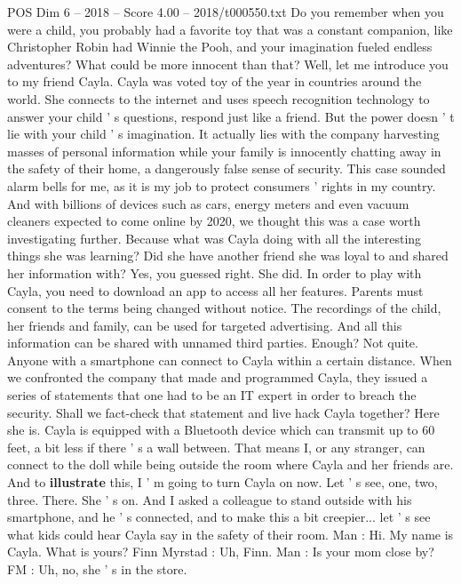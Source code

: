\begin{textsample}{POS Dim 6 – 2018 – Score 4.00 – 2018/t000550.txt}  \label{ex:f6_pos_063}
Do you remember when you were a child, you probably had a favorite toy that was a constant companion, like Christopher Robin had Winnie the Pooh, and your imagination fueled endless adventures?
What could be more innocent than that?
Well, let me introduce you to my friend Cayla.
Cayla was voted toy of the year in countries around the world.
She connects to the internet and uses speech recognition technology to answer your child ' s questions, respond just like a friend.
But the power doesn ' t lie with your child ' s imagination.
It actually lies with the company harvesting masses of personal information while your family is innocently chatting away in the safety of their home, a dangerously false sense of security.
This case sounded alarm bells for me, as it is my job to protect consumers ' rights in my country.
And with billions of devices such as cars, energy meters and even vacuum cleaners expected to come online by 2020, we thought this was a case worth investigating further.
Because what was Cayla doing with all the interesting things she was learning?
Did she have another friend she was loyal to and shared her information with?
Yes, you guessed right.
She did.
In order to play with Cayla, you need to download an app to access all her features.
Parents must consent to the terms being changed without notice.
The recordings of the child, her friends and family, can be used for targeted advertising.
And all this information can be shared with unnamed third parties.
Enough?
Not quite.
Anyone with a smartphone can connect to Cayla within a certain distance.
When we confronted the company that made and programmed Cayla, they issued a series of statements that one had to be an IT expert in order to breach the security.
Shall we fact-check that statement and live hack Cayla together?
Here she is.
Cayla is equipped with a Bluetooth device which can transmit up to 60 feet, a bit less if there ' s a wall between.
That means I, or any stranger, can connect to the doll while being outside the room where Cayla and her friends are.
And to \textbf{illustrate} this, I ' m going to turn Cayla on now.
Let ' s see, one, two, three.
There.
She ' s on.
And I asked a colleague to stand outside with his smartphone, and he ' s connected, and to make this a bit creepier... let ' s see what kids could hear Cayla say in the safety of their room.
Man : Hi.
My name is Cayla.
What is yours?
Finn Myrstad : Uh, Finn.
Man : Is your mom close by?
FM : Uh, no, she ' s in the store.

\end{textsample}
